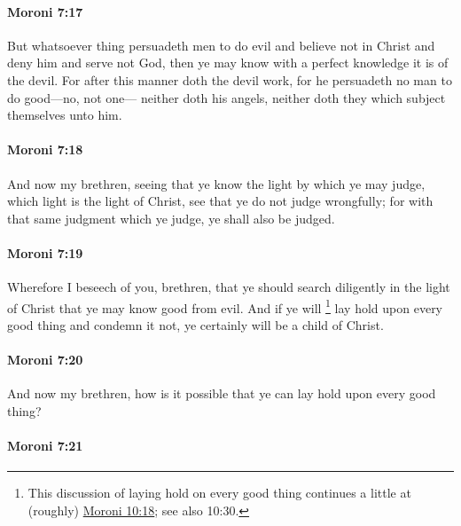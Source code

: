 		\paragraph{Moroni 7:17} %
			\label{MORONI-7-17}
			
			But whatsoever thing persuadeth men to do evil
			and believe not in Christ and deny him and serve not God,
			then ye may know with a perfect knowledge it is of the devil.
			For after this manner doth the devil work,
			for he persuadeth no man to do good---no, not one---
			neither doth his angels,
			neither doth they which subject themselves unto him.
			
		\paragraph{Moroni 7:18} %
			\label{MORONI-7-18}
			
			And now my brethren,
			seeing that ye know the light by which ye may judge,
			which light is the light of Christ,
			see that ye do not judge wrongfully;
			for with that same judgment which ye judge,
			ye shall also be judged.

		\paragraph{Moroni 7:19} %
			\label{MORONI-7-19}

			Wherefore I beseech of you, brethren,
			that ye should search diligently in the light of Christ
			that ye may know good from evil.
			And if ye will
				\footnote{%
					This discussion of laying hold on every good thing continues a little at (roughly) \hyperref[MORONI-10-18]{Moroni 10:18}; see also 10:30.
					}%
			lay hold upon every good thing and condemn it not,
			ye certainly will be a child of Christ.

		\paragraph{Moroni 7:20} %
			\label{MORONI-7-20}

			And now my brethren,
			how is it possible that ye can lay hold upon every good thing?

		\paragraph{Moroni 7:21} %
			\label{MORONI-7-21}


